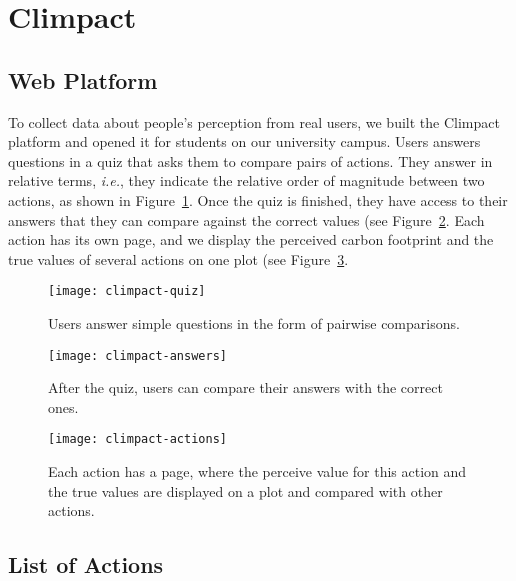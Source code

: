 \section{Climpact}

\subsection{Web Platform}
\label{app:clm:climpact}

To collect data about people's perception from real users, we built the Climpact platform and opened it for students on our university campus.
Users answers questions in a quiz that asks them to compare pairs of actions.
They answer in relative terms, \textit{i.e.}, they indicate the relative order of magnitude between two actions, as shown in Figure~\ref{app:fig:climpactquiz}.
Once the quiz is finished, they have access to their answers that they can compare against the correct values (see Figure~\ref{app:fig:climpactanswers}.
Each action has its own page, and we display the perceived carbon footprint and the true values of several actions on one plot (see Figure~\ref{app:fig:climpactactions}.

\begin{figure}
	\centering
	\texttt{[image: climpact-quiz]}
	\caption{Users answer simple questions in the form of pairwise comparisons.}
	\label{app:fig:climpactquiz}
\end{figure}

\begin{figure}
	\centering
	\texttt{[image: climpact-answers]}
	\caption{After the quiz, users can compare their answers with the correct ones.}
	\label{app:fig:climpactanswers}
\end{figure}

\begin{figure}
	\centering
	\texttt{[image: climpact-actions]}
	\caption{Each action has a page, where the perceive value for this action and the true values are displayed on a plot and compared with other actions.}
	\label{app:fig:climpactactions}
\end{figure}

\subsection{List of Actions}
\label{app:clm:actions}

